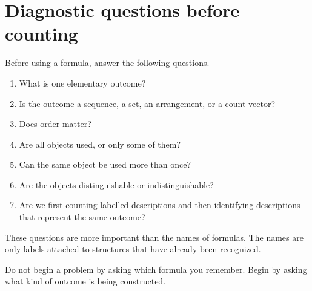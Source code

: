 \section{Diagnostic questions before counting}

Before using a formula, answer the following questions.

\begin{enumerate}
    \item What is one elementary outcome?
    \item Is the outcome a sequence, a set, an arrangement, or a count vector?
    \item Does order matter?
    \item Are all objects used, or only some of them?
    \item Can the same object be used more than once?
    \item Are the objects distinguishable or indistinguishable?
    \item Are we first counting labelled descriptions and then identifying descriptions that represent the same outcome?
\end{enumerate}

These questions are more important than the names of formulas. The names are only labels attached to structures that have already been recognized.

\begin{remarkbox}
Do not begin a problem by asking which formula you remember. Begin by asking what kind of outcome is being constructed.
\end{remarkbox}
